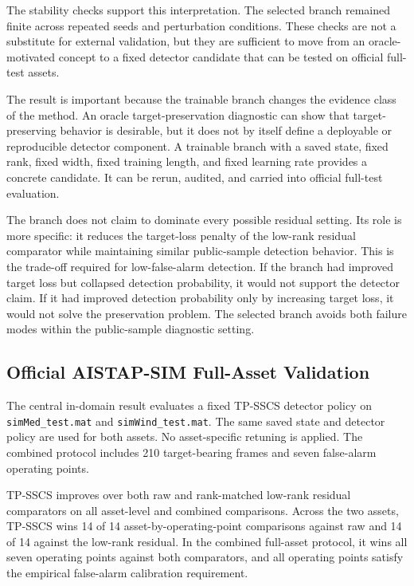 \documentclass[journal]{IEEEtran}
\begin{document}
The stability checks support this interpretation. The selected branch remained finite across repeated seeds and perturbation conditions. These checks are not a substitute for external validation, but they are sufficient to move from an oracle-motivated concept to a fixed detector candidate that can be tested on official full-test assets.

The result is important because the trainable branch changes the evidence class of the method. An oracle target-preservation diagnostic can show that target-preserving behavior is desirable, but it does not by itself define a deployable or reproducible detector component. A trainable branch with a saved state, fixed rank, fixed width, fixed training length, and fixed learning rate provides a concrete candidate. It can be rerun, audited, and carried into official full-test evaluation.

The branch does not claim to dominate every possible residual setting. Its role is more specific: it reduces the target-loss penalty of the low-rank residual comparator while maintaining similar public-sample detection behavior. This is the trade-off required for low-false-alarm detection. If the branch had improved target loss but collapsed detection probability, it would not support the detector claim. If it had improved detection probability only by increasing target loss, it would not solve the preservation problem. The selected branch avoids both failure modes within the public-sample diagnostic setting.

\subsection{Official AISTAP-SIM Full-Asset Validation}

The central in-domain result evaluates a fixed TP-SSCS detector policy on \texttt{simMed\_test.mat} and \texttt{simWind\_test.mat}. The same saved state and detector policy are used for both assets. No asset-specific retuning is applied. The combined protocol includes 210 target-bearing frames and seven false-alarm operating points.

TP-SSCS improves over both raw and rank-matched low-rank residual comparators on all asset-level and combined comparisons. Across the two assets, TP-SSCS wins 14 of 14 asset-by-operating-point comparisons against raw and 14 of 14 against the low-rank residual. In the combined full-asset protocol, it wins all seven operating points against both comparators, and all operating points satisfy the empirical false-alarm calibration requirement.
\end{document}
